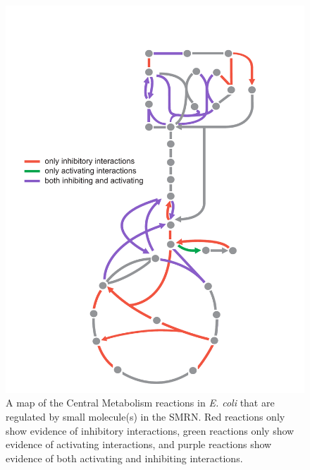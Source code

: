\documentclass[12pt,a4paper]{article}
\begin{document}
\begin{figure}[ht!]
	\includegraphics[width=\textwidth]{../manuscript/figS8.pdf}
	\caption{A map of the Central Metabolism reactions in \emph{E. coli} that are regulated by small molecule(s) in the SMRN. Red reactions only show evidence of inhibitory interactions, green reactions only show evidence of activating interactions, and purple reactions show evidence of both activating and inhibiting interactions. 
	}
\end{figure}
\end{document}
